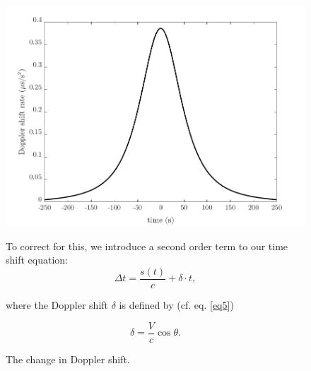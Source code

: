 \begin{figure}[ht!]
	\begin{minipage}{.5\textwidth}
		\centering
		\includegraphics[width=\linewidth]{assets/doppler_shift_rate.png}
		\caption{The change in Doppler shift.}
		\label{fig:doppler_shift_rate}
	\end{minipage}%
	\begin{minipage}{.5\textwidth}
		To correct for this, we introduce a second order term to our time shift equation:
		\begin{equation}
		\Delta t = \frac{s(t)}{c} + \delta \cdot t,
		\end{equation}
		
		where the Doppler shift $\delta$ is defined by (cf. eq. \ref{eq5})
		
		\begin{equation}
		\delta = \frac{V}{c} \cos\theta.
		\end{equation}
	\end{minipage}
\end{figure}
